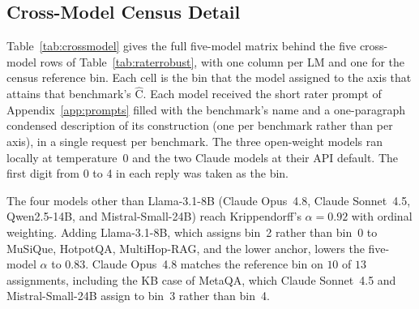 \documentclass[11pt]{article}
\newcommand{\Chat}{\widehat{\mathrm{C}}}
\begin{document}
\subsection{Cross-Model Census Detail}
\label{app:crossmodel}
Table~\ref{tab:crossmodel} gives the full five-model matrix behind the five cross-model rows of Table~\ref{tab:raterrobust}, with one column per LM and one for the census reference bin. Each cell is the bin that the model assigned to the axis that attains that benchmark's $\Chat$. Each model received the short rater prompt of Appendix~\ref{app:prompts} filled with the benchmark's name and a one-paragraph condensed description of its construction (one per benchmark rather than per axis), in a single request per benchmark. The three open-weight models ran locally at temperature~0 and the two Claude models at their API default. The first digit from 0 to 4 in each reply was taken as the bin.

The four models other than Llama-3.1-8B (Claude Opus~4.8, Claude Sonnet~4.5, Qwen2.5-14B, and Mistral-Small-24B) reach Krippendorff's $\alpha=0.92$ with ordinal weighting. Adding Llama-3.1-8B, which assigns bin~2 rather than bin~0 to MuSiQue, HotpotQA, MultiHop-RAG, and the lower anchor, lowers the five-model $\alpha$ to $0.83$. Claude Opus~4.8 matches the reference bin on $10$ of $13$ assignments, including the KB case of MetaQA, which Claude Sonnet~4.5 and Mistral-Small-24B assign to bin~3 rather than bin~4.
\end{document}
